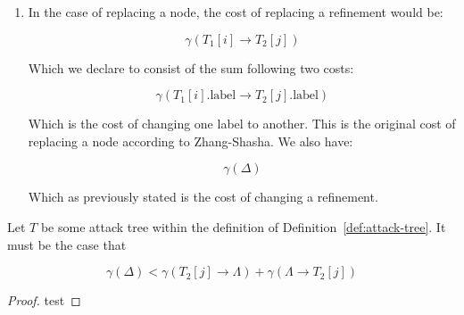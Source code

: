 \begin{definition}
\begin{enumerate}
      \item In the case of replacing a node, the cost of replacing a refinement would be:

$$\gamma({T_1[i]} \rightarrow {T_2[j]})$$

Which we declare to consist of the sum following two costs:

$$\gamma({T_1[i].\text{label}} \rightarrow {T_2[j].\text{label}})$$

Which is the cost of changing one label to another. This is the original cost of replacing a node according to Zhang-Shasha. We also have:

$$\gamma(\Delta)$$

Which as previously stated is the cost of changing a refinement.



\end{enumerate}

\end{definition}


\begin{lemma}
Let $T$ be some attack tree within the definition of Definition~\ref{def:attack-tree}. It must be the case that

\[\gamma(\Delta) < \gamma(T_2[j] \rightarrow {\Lambda}) + \gamma(\Lambda \rightarrow {T_2[j]})\]

\begin{proof}
      test
\end{proof}


\end{lemma}







